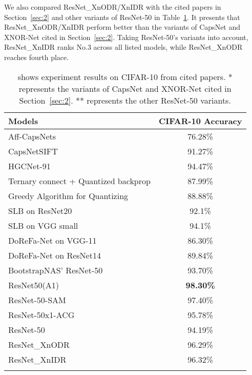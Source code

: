 \documentclass[sn-mathphys,iicol,Numbered]{sn-jnl}
\begin{document}
We also compared ResNet\_XnODR/XnIDR with the cited papers in Section~\ref{sec:2} and other variants of ResNet-50 in Table~\ref{tab:resnet-cifar10}. It presents that ResNet\_XnODR/XnIDR perform better than the variants of CapsNet and XNOR-Net cited in Section~\ref{sec:2}. Taking ResNet-50's variants into account, ResNet\_XnIDR ranks No.3 across all listed models, while ResNet\_XnODR reaches fourth place.

\begin{table}[ht]
\caption{shows experiment results on CIFAR-10 from cited papers. * represents the variants of CapsNet and XNOR-Net cited in Section~\ref{sec:2}. ** represents the other ResNet-50 variants.} 
\begin{tabular}{@{}l|c@{}}
\toprule
Models & CIFAR-10 Accuracy \\
\midrule
Aff-CapsNets \citep{A24_Rob_Caps} & 76.28\% \\
CapsNetSIFT \citep{A44_CapsnetSIFT} & 91.27\% \\
HGCNet-91 \citep{A43_high_eff} & 94.47\% \\
\multirow{2}{4.cm}{Ternary connect + Quantized backprop 
 \citep{A37_mul}} & \multirow{2}{*}{87.99\%} \\ 
 & \\
\multirow{2}{4.cm}{Greedy Algorithm for Quantizing \citep{A39_grdy}} & \multirow{2}{*}{88.88\%} \\
 & \\
SLB on ResNet20 \citep{A40_low_bit} & 92.1\% \\
SLB on VGG small \citep{A40_low_bit} & 94.1\% \\
DoReFa-Net on VGG-11 \citep{A41_prune} & 86.30\% \\
DoReFa-Net on ResNet14 \citep{A41_prune} & 89.84\% \\
\midrule
BootstrapNAS’ ResNet-50~ \citep{A61_BootstrapNAS} & 93.70\% \\
ResNet50(A1)~\citep{A72_ResNet50_A1} & \textbf{98.30\%} \\
ResNet-50-SAM~\citep{A73_ResNet50-Sam} & 97.40\% \\
ResNet-50x1-ACG~\citep{A74_ResNet50x1-ACG} & 95.78\% \\
\midrule
ResNet-50 & 94.19\% \\
ResNet\_XnODR & 96.29\% \\
ResNet\_XnIDR & 96.32\% \\
\botrule
\end{tabular} \label{tab:resnet-cifar10}
\end{table}
\end{document}
